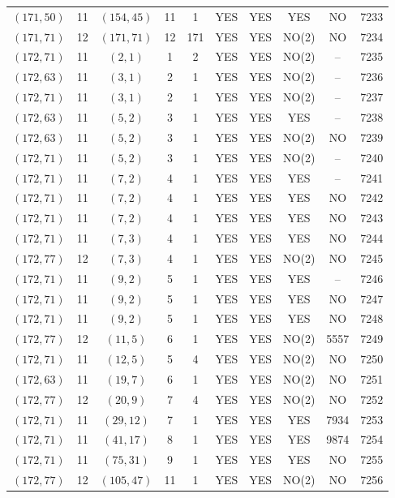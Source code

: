 \begin{longtable}{|c|c|c|c|c|c|c|c|c|c|}
$(171, 50)$ & 11 & $(154, 45)$ & 11 & 1 & YES & YES & YES & NO & 7233\\
$(171, 71)$ & 12 & $(171, 71)$ & 12 & 171 & YES & YES & NO(2) & NO & 7234\\
$(172, 71)$ & 11 & $(2, 1)$ & 1 & 2 & YES & YES & NO(2) & -- & 7235\\
$(172, 63)$ & 11 & $(3, 1)$ & 2 & 1 & YES & YES & NO(2) & -- & 7236\\
$(172, 71)$ & 11 & $(3, 1)$ & 2 & 1 & YES & YES & NO(2) & -- & 7237\\
$(172, 63)$ & 11 & $(5, 2)$ & 3 & 1 & YES & YES & YES & -- & 7238\\
$(172, 63)$ & 11 & $(5, 2)$ & 3 & 1 & YES & YES & NO(2) & NO & 7239\\
$(172, 71)$ & 11 & $(5, 2)$ & 3 & 1 & YES & YES & NO(2) & -- & 7240\\
$(172, 71)$ & 11 & $(7, 2)$ & 4 & 1 & YES & YES & YES & -- & 7241\\
$(172, 71)$ & 11 & $(7, 2)$ & 4 & 1 & YES & YES & YES & NO & 7242\\
$(172, 71)$ & 11 & $(7, 2)$ & 4 & 1 & YES & YES & YES & NO & 7243\\
$(172, 71)$ & 11 & $(7, 3)$ & 4 & 1 & YES & YES & YES & NO & 7244\\
$(172, 77)$ & 12 & $(7, 3)$ & 4 & 1 & YES & YES & NO(2) & NO & 7245\\
$(172, 71)$ & 11 & $(9, 2)$ & 5 & 1 & YES & YES & YES & -- & 7246\\
$(172, 71)$ & 11 & $(9, 2)$ & 5 & 1 & YES & YES & YES & NO & 7247\\
$(172, 71)$ & 11 & $(9, 2)$ & 5 & 1 & YES & YES & YES & NO & 7248\\
$(172, 77)$ & 12 & $(11, 5)$ & 6 & 1 & YES & YES & NO(2) & 5557 & 7249\\
$(172, 71)$ & 11 & $(12, 5)$ & 5 & 4 & YES & YES & NO(2) & NO & 7250\\
$(172, 63)$ & 11 & $(19, 7)$ & 6 & 1 & YES & YES & NO(2) & NO & 7251\\
$(172, 77)$ & 12 & $(20, 9)$ & 7 & 4 & YES & YES & NO(2) & NO & 7252\\
$(172, 71)$ & 11 & $(29, 12)$ & 7 & 1 & YES & YES & YES & 7934 & 7253\\
$(172, 71)$ & 11 & $(41, 17)$ & 8 & 1 & YES & YES & YES & 9874 & 7254\\
$(172, 71)$ & 11 & $(75, 31)$ & 9 & 1 & YES & YES & YES & NO & 7255\\
$(172, 77)$ & 12 & $(105, 47)$ & 11 & 1 & YES & YES & NO(2) & NO & 7256\\

\end{longtable}
